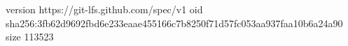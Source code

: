 version https://git-lfs.github.com/spec/v1
oid sha256:3fb62d9692fbd6e233eaae455166c7b8250f71d57fc053aa937faa10b6a24a90
size 113523
